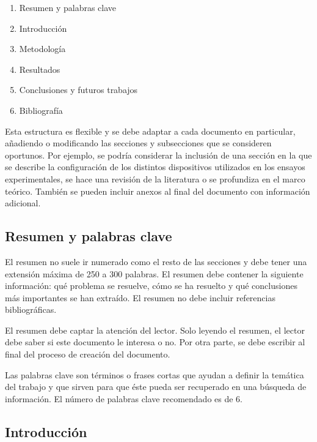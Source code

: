 \documentclass[11pt]{article}
\begin{document}
\begin{enumerate} \itemsep = 0ex %
    \item Resumen y palabras clave
    \item Introducción
    \item Metodología
    \item Resultados
    \item Conclusiones y futuros trabajos
    \item Bibliografía
\end{enumerate}

Esta estructura es flexible y se debe adaptar a cada documento en particular, añadiendo o modificando las secciones y subsecciones que se consideren oportunos. Por ejemplo, se podría considerar la inclusión de una sección en la que se describe la configuración de los distintos dispositivos utilizados en los ensayos experimentales, se hace una revisión de la literatura o se profundiza en el marco teórico. También se pueden incluir anexos al final del documento con información adicional.

\subsection{Resumen y palabras clave}

El resumen no suele ir numerado como el resto de las secciones y debe tener una extensión máxima de 250 a 300 palabras. El resumen debe contener la siguiente información: qué problema se resuelve, cómo se ha resuelto y qué conclusiones más importantes se han extraído. El resumen no debe incluir referencias bibliográficas.

El resumen debe captar la atención del lector. Solo leyendo el resumen, el lector debe saber si este documento le interesa o no. Por otra parte, se debe escribir al final del proceso de creación del documento.

Las palabras clave son términos o frases cortas que ayudan a definir la temática del trabajo y que sirven para que éste pueda ser recuperado en una búsqueda de información. El número de palabras clave recomendado es de 6.

\subsection{Introducción}
\end{document}
